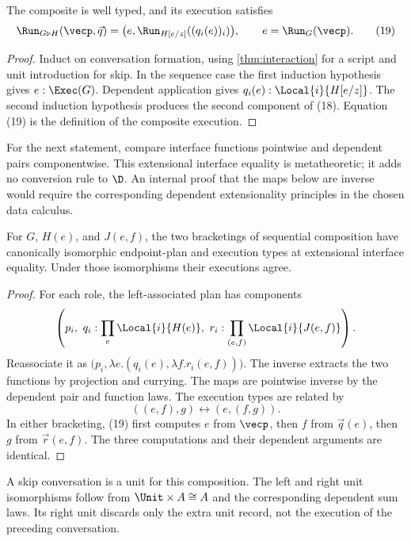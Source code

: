 \begin{proposition}
\label{prop:sequence}
The composite is well typed, and its execution satisfies
\[
 \Run_{G\triangleright H}(\vecp,\vec q)
   =\bigl(e,\Run_{H[e/z]}((q_i(e))_i)\bigr),
 \qquad e=\Run_G(\vecp).
 \tag{19}
\]
\end{proposition}
\begin{proof}
Induct on conversation formation, using \cref{thm:interaction} for a script
and unit introduction for skip. In the sequence case the first induction
hypothesis gives $e:\Exec(G)$. Dependent application gives
$q_i(e):\Local{i}{H[e/z]}$. The second induction hypothesis produces the
second component of (18). Equation (19) is the definition of the composite
execution.
\end{proof}

For the next statement, compare interface functions pointwise and dependent
pairs componentwise. This extensional interface equality is metatheoretic;
it adds no conversion rule to $\D$. An internal proof that the maps below are
inverse would require the corresponding dependent extensionality principles
in the chosen data calculus.

\begin{lemma}
\label{thm:associativity}
For $G$, $H(e)$, and $J(e,f)$, the two bracketings of sequential composition
have canonically isomorphic endpoint-plan and execution types at extensional
interface equality. Under those isomorphisms their executions agree.
\end{lemma}
\begin{proof}
For each role, the left-associated plan has components
\[
 \left(p_i,\ q_i:\prod_e\Local{i}{H(e)},\
                  r_i:\prod_{(e,f)}\Local{i}{J(e,f)}\right).
\]
Reassociate it as
$\bigl(p_i,\lambda e.(q_i(e),\lambda f.r_i(e,f))\bigr)$.
The inverse extracts the two functions by projection and currying. The maps
are pointwise inverse by the dependent pair and function laws. The execution types are
related by
\[
 ((e,f),g)\longleftrightarrow(e,(f,g)).
\]
In either bracketing, (19) first computes $e$ from $\vecp$, then $f$ from
$\vec q(e)$, then $g$ from $\vec r(e,f)$. The three computations and their
dependent arguments are identical.
\end{proof}

A skip conversation is a unit for this composition. The left and
right unit isomorphisms follow from $\Unit\times A\cong A$ and the
corresponding dependent sum laws. Its right unit discards only the extra unit
record, not the execution of the preceding conversation.

